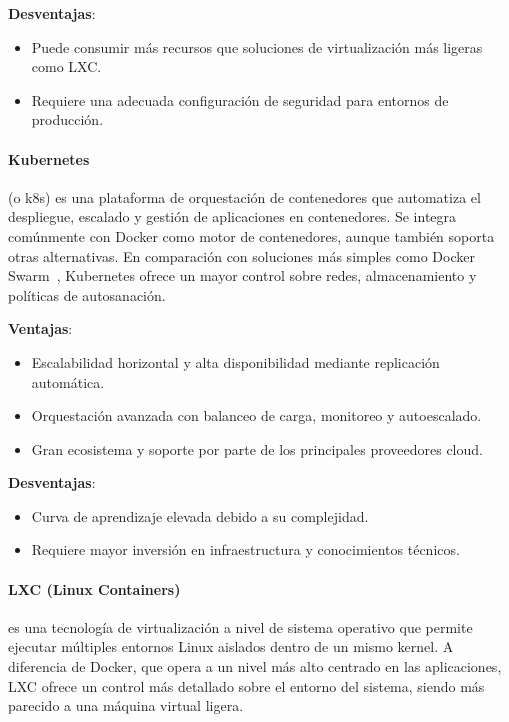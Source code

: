 \textbf{Desventajas}:
\begin{itemize}
    \item Puede consumir más recursos que soluciones de virtualización más ligeras como LXC.
    \item Requiere una adecuada configuración de seguridad para entornos de producción.
\end{itemize}

\paragraph{Kubernetes~\cite{kubernetes}} (o \gls{k8s}) es una plataforma de orquestación de contenedores que automatiza el despliegue, escalado y gestión de aplicaciones en contenedores. Se integra comúnmente con Docker como motor de contenedores, aunque también soporta otras alternativas. En comparación con soluciones más simples como Docker Swarm~\cite{dockerswarm}, Kubernetes ofrece un mayor control sobre redes, almacenamiento y políticas de autosanación.

\textbf{Ventajas}:
\begin{itemize}
    \item Escalabilidad horizontal y alta disponibilidad mediante replicación automática.
    \item Orquestación avanzada con balanceo de carga, monitoreo y autoescalado.
    \item Gran ecosistema y soporte por parte de los principales proveedores cloud.
\end{itemize}

\textbf{Desventajas}:
\begin{itemize}
    \item Curva de aprendizaje elevada debido a su complejidad.
    \item Requiere mayor inversión en infraestructura y conocimientos técnicos.
\end{itemize}

\paragraph{LXC (Linux Containers)~\cite{lxc}} es una tecnología de virtualización a nivel de sistema operativo que permite ejecutar múltiples entornos Linux aislados dentro de un mismo kernel. A diferencia de Docker, que opera a un nivel más alto centrado en las aplicaciones, LXC ofrece un control más detallado sobre el entorno del sistema, siendo más parecido a una máquina virtual ligera.

